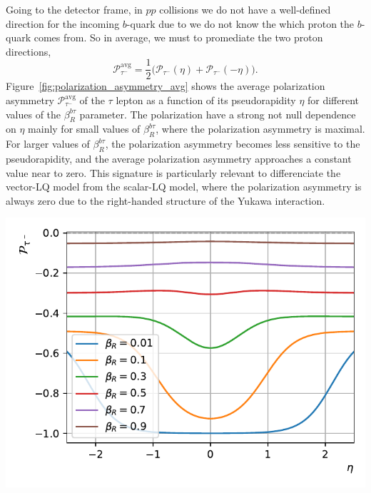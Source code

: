 Going to the detector frame, in $pp$ collisions we do not have a well-defined direction for the incoming $b$-quark due to we do not know the which proton the $b$-quark comes from. So in average, we must to promediate the two proton directions, 
\begin{equation}
    \mathcal{P}_{\tau^-}^{\text{avg}} = \frac{1}{2}\big(\mathcal{P}_{\tau^-}(\eta) + \mathcal{P}_{\tau^-}(-\eta)\big).
\end{equation}
Figure~\ref{fig:polarization_asymmetry_avg} shows the average polarization asymmetry $\mathcal{P}_{\tau^-}^{\text{avg}}$ of the $\tau$ lepton as a function of its pseudorapidity $\eta$ for different values of the $\beta_R^{b\tau}$ parameter. The polarization have a strong not null dependence on $\eta$ mainly for small values of $\beta_R^{b\tau}$, where the polarization asymmetry is maximal. For larger values of $\beta_R^{b\tau}$, the polarization asymmetry becomes less sensitive to the pseudorapidity, and the average polarization asymmetry approaches a constant value near to zero. This signature is particularly relevant to differenciate the vector-LQ model from the scalar-LQ model, where the polarization asymmetry is always zero due to the right-handed structure of the Yukawa interaction.

\begin{center}
    \includegraphics[width=.9\linewidth]{Images/P_vlQ_tau_minus_vs_eta_avg.pdf}
    \label{fig:polarization_asymmetry_avg}
\end{center}

